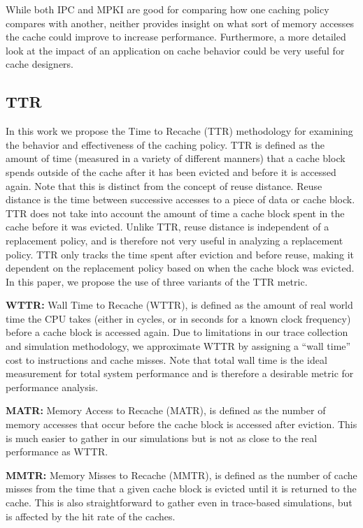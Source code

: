 While both IPC and MPKI are good for comparing how one caching policy compares with another,
	neither provides insight on what sort of memory accesses the cache could improve to increase performance.
Furthermore, a more detailed look at the impact of an application on cache behavior could be very useful for cache designers.

\subsection{TTR}
\label{sec:metrics}
In this work we propose the Time to Recache (TTR) methodology for examining the behavior and effectiveness of the caching policy.
TTR is defined as the amount of time (measured in a variety of different manners) that a cache block spends outside of the cache after it has been evicted and before it is accessed again.
Note that this is distinct from the concept of reuse distance. 
Reuse distance is the time between successive accesses to a piece of data or cache block. 
TTR does not take into account the amount of time a cache block spent in the cache before it was evicted.
Unlike TTR, reuse distance is independent of a replacement policy, and is therefore not very useful in analyzing a replacement policy.
TTR only tracks the time spent after eviction and before reuse, making it dependent on the replacement policy based on when the cache block was evicted.
In this paper, we propose the use of three variants of the TTR metric. 

\textbf{WTTR:}
Wall Time to Recache (WTTR), is defined as the amount of real world time the CPU takes (either in cycles, or in seconds for a known clock frequency) before a cache block is accessed again.
Due to limitations in our trace collection and simulation methodology, we approximate WTTR by assigning a ``wall time'' cost to instructions and cache misses.
Note that total wall time is the ideal measurement for total system performance and is therefore a desirable metric for performance analysis.

\textbf{MATR:}
Memory Access to Recache (MATR), is defined as the number of memory accesses that occur before the cache block is accessed after eviction.
This is much easier to gather in our simulations but is not as close to the real performance as WTTR.

\textbf{MMTR:}
Memory Misses to Recache (MMTR), is defined as the number of cache misses from the time that a given cache block is evicted until it is returned to the cache.
This is also straightforward to gather even in trace-based simulations, but is affected by the hit rate of the caches.

